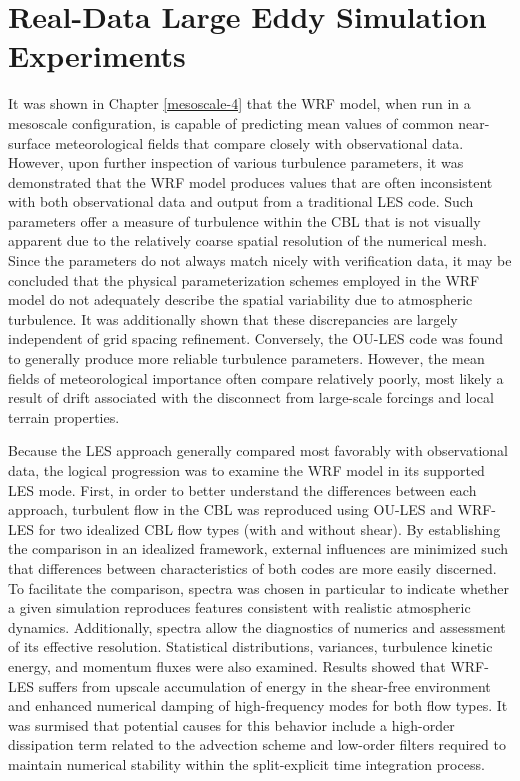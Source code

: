 \chapter{Real-Data Large Eddy Simulation Experiments}
\label{nudge-6}

It was shown in Chapter \autoref{mesoscale-4} that the WRF model, when run in a mesoscale configuration, is capable of predicting mean values of common near-surface meteorological fields that compare closely with observational data. However, upon further inspection of various turbulence parameters, it was demonstrated that the WRF model produces values that are often inconsistent with both observational data and output from a traditional LES code. Such parameters offer a measure of turbulence within the CBL that is not visually apparent due to the relatively coarse spatial resolution of the numerical mesh. Since the parameters do not always match nicely with verification data, it may be concluded that the physical parameterization schemes employed in the WRF model do not adequately describe the spatial variability due to atmospheric turbulence. It was additionally shown that these discrepancies are largely independent of grid spacing refinement. Conversely, the OU-LES code was found to generally produce more reliable turbulence parameters. However, the mean fields of meteorological importance often compare relatively poorly, most likely a result of drift associated with the disconnect from large-scale forcings and local terrain properties.

Because the LES approach generally compared most favorably with observational data, the logical progression was to examine the WRF model in its supported LES mode. First, in order to better understand the differences between each approach, turbulent flow in the CBL was reproduced using OU-LES and WRF-LES for two idealized CBL flow types (with and without shear). By establishing the comparison in an idealized framework, external influences are minimized such that differences between characteristics of both codes are more easily discerned. To facilitate the comparison, spectra was chosen in particular to indicate whether a given simulation reproduces features consistent with realistic atmospheric dynamics. Additionally, spectra allow the diagnostics of numerics and assessment of its effective resolution. Statistical distributions, variances, turbulence kinetic energy, and momentum fluxes were also examined. Results showed that WRF-LES suffers from upscale accumulation of energy in the shear-free environment and enhanced numerical damping of high-frequency modes for both flow types. It was surmised that potential causes for this behavior include a high-order dissipation term related to the advection scheme and low-order filters required to maintain numerical stability within the split-explicit time integration process.

